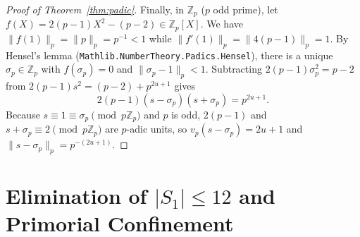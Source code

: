 \documentclass[11pt]{amsart}
\theoremstyle{definition}
\theoremstyle{remark}
\begin{document}
\begin{proof}[Proof of Theorem~\ref{thm:padic}]
Finally, in $\mathbb{Z}_p$ ($p$ odd prime), let $f(X) = 2(p - 1)X^2 - (p - 2) \in \mathbb{Z}_p[X]$. We have $\|f(1)\|_p = \|p\|_p = p^{-1} < 1$ while $\|f'(1)\|_p = \|4(p - 1)\|_p = 1$. By Hensel's lemma (\texttt{Mathlib.NumberTheory.Padics.Hensel}), there is a unique $\sigma_p \in \mathbb{Z}_p$ with $f(\sigma_p) = 0$ and $\|\sigma_p - 1\|_p < 1$. Subtracting $2(p - 1)\sigma_p^2 = p - 2$ from $2(p - 1)s^2 = (p - 2) + p^{2u + 1}$ gives
\[
  2(p - 1)(s - \sigma_p)(s + \sigma_p) = p^{2u + 1}.
\]
Because $s \equiv 1 \equiv \sigma_p \pmod{p\mathbb{Z}_p}$ and $p$ is odd, $2(p - 1)$ and $s + \sigma_p \equiv 2 \pmod{p\mathbb{Z}_p}$ are $p$-adic units, so $v_p(s - \sigma_p) = 2u + 1$ and $\|s - \sigma_p\|_p = p^{-(2u + 1)}$.
\end{proof}

\section{Elimination of $|S_1| \le 12$ and Primorial Confinement}
\end{document}
